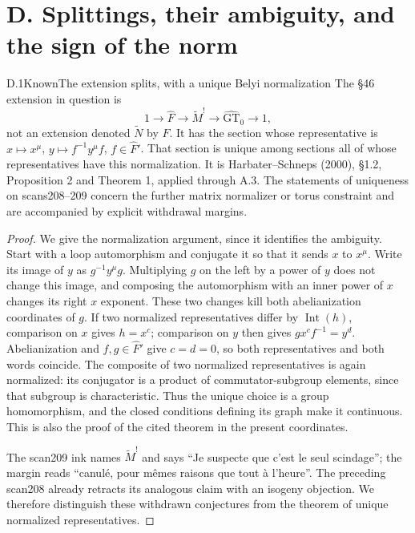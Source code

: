 \section{D. Splittings, their ambiguity, and the sign of the norm}

\begin{claim}{D.1}{Known}{The extension splits, with a unique Belyi normalization}
The \S46 extension in question is
\[
 1\longrightarrow\widehat F\longrightarrow\widetilde M^!
 \longrightarrow\widehat{\mathrm{GT}}_0\longrightarrow1,
\]
not an extension denoted $\widetilde N$ by $\widehat F$. It has the section whose representative is
$x\mapsto x^\mu$, $y\mapsto f^{-1}y^\mu f$, $f\in\widehat F'$. That section is unique among sections all of whose representatives have this normalization. It is Harbater--Schneps (2000), \S1.2, Proposition 2 and Theorem 1, applied through A.3. The statements of uniqueness on scans208--209 concern the further matrix normalizer or torus constraint and are accompanied by explicit withdrawal margins.
\end{claim}

\begin{proof}
We give the normalization argument, since it identifies the ambiguity. Start with a loop automorphism and conjugate it so that it sends $x$ to $x^\mu$. Write its image of $y$ as $g^{-1}y^\mu g$. Multiplying $g$ on the left by a power of $y$ does not change this image, and composing the automorphism with an inner power of $x$ changes its right $x$ exponent. These two changes kill both abelianization coordinates of $g$. If two normalized representatives differ by $\operatorname{Int}(h)$, comparison on $x$ gives $h=x^c$; comparison on $y$ then gives $g x^c f^{-1}=y^d$. Abelianization and $f,g\in\widehat F'$ give $c=d=0$, so both representatives and both words coincide. The composite of two normalized representatives is again normalized: its conjugator is a product of commutator-subgroup elements, since that subgroup is characteristic. Thus the unique choice is a group homomorphism, and the closed conditions defining its graph make it continuous. This is also the proof of the cited theorem in the present coordinates.

The scan209 ink names $\widetilde M^!$ and says ``Je suspecte que c'est le seul scindage''; the margin reads ``canul\'e, pour m\^emes raisons que tout \`a l'heure''. The preceding scan208 already retracts its analogous claim with an isogeny objection. We therefore distinguish these withdrawn conjectures from the theorem of unique normalized representatives.
\end{proof}

